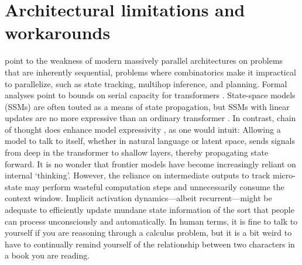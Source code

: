 \documentclass{llmxive}
\begin{document}
\section{Architectural limitations and workarounds}

\citet{liu2026serialscalinghypothesis} point to the weakness of modern massively
parallel architectures on problems that are inherently sequential, problems where 
combinatorics make it impractical to parallelize, such as 
state tracking, multihop inference, and planning. Formal analyses point
to bounds on serial capacity for transformers 
\citep{merrill-sabharwal-2023-parallelism}. State-space models (SSMs) are often
touted as a means of state propagation, but SSMs with linear updates are
no more expressive than an ordinary transformer \citep{merrill2025illusion}.
In contrast, chain of thought does enhance model expressivity 
\citep{li2024chain,merrill2024cot}, as one would intuit:  Allowing a model
to talk to itself, whether in natural language or latent space, sends signals
from deep in the transformer to shallow layers, thereby propagating state forward.
It is no wonder that frontier models have become increasingly reliant on internal
`thinking'. However, the reliance on intermediate outputs to track
micro-state may perform wasteful computation steps and unnecessarily consume the context window. Implicit activation dynamics---albeit recurrent---might be adequate to 
efficiently update mundane state information of the sort that people can 
process unconsciously  and automatically. 
In human terms, it is fine to talk to yourself if you are reasoning through a 
calculus problem,  but it is a bit weird to have to continually remind yourself of 
the relationship between two characters in a book you are reading.
\end{document}

